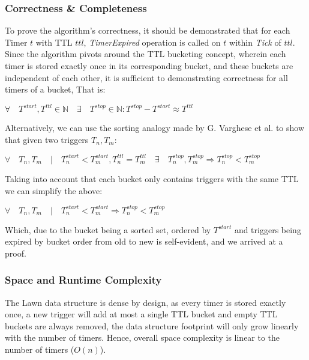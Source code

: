 \documentclass[acmsmall]{acmart} %
\begin{document}
\subsubsection{Correctness \& Completeness}
To prove the algorithm's correctness, it should be demonstrated that for each Timer $t$ with TTL $ttl$,  \textit{TimerExpired} operation is called on $t$ within \textit{Tick} of $ttl$. Since the algorithm pivots around the TTL bucketing concept, wherein each timer is stored exactly once in its corresponding bucket, and these buckets are independent of each other, it is sufficient to demonstrating correctness for all timers of a bucket, That is:
\begin{center}
	$\forall \quad T^{start}, T^{ttl} \in \mathbb{N} \quad \exists \quad T^{stop} \in \mathbb{N} : T^{stop}-T^{start} \approx T^{ttl}$
\end{center}

Alternatively, we can use the sorting analogy made by G. Varghese et al.\cite{TW} to show that given two triggers $T_n, T_m$: 

\begin{center}
	$\forall \quad T_n, T_m \quad | \quad T^{start}_n<T^{start}_m,  T^{ttl}_n = T^{ttl}_m \quad \exists\quad T^{stop}_n, T^{stop}_m  \Rightarrow T^{stop}_n < T^{stop}_m$
\end{center}

Taking into account that each bucket only contains triggers with the same TTL we can simplify the above:

\begin{center}
	$\forall \quad T_n, T_m \quad | \quad T^{start}_n<T^{start}_m \Rightarrow T^{stop}_n < T^{stop}_m$
\end{center}

Which, due to the bucket being a sorted set, ordered by $T^{start}$ and triggers being expired by bucket order from old to new is self-evident, and we arrived at a proof.

\subsubsection{Space and Runtime Complexity}
The Lawn data structure is dense by design, as every timer is stored exactly once, a new trigger will add at most a single TTL bucket and empty TTL buckets are always removed, the data structure footprint will only grow linearly with the number of timers. Hence, overall space complexity is linear to the number of timers ($O(n)$). 
\end{document}
